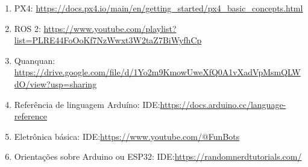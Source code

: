 \begin{enumerate}
    \item PX4: \url{https://docs.px4.io/main/en/getting_started/px4_basic_concepts.html}

    \item ROS 2: \url{https://www.youtube.com/playlist?list=PLRE44FoOoKf7NzWwxt3W2taZ7BiWyfhCp}

    \item Quanquan: \url{https://drive.google.com/file/d/1Yo2m9KmowUweXfQ0A1vXadVpMsmQLWdO/view?usp=sharing}

    \item Referência de linguagem Arduíno: IDE:\url{https://docs.arduino.cc/language-reference} 

    \item Eletrônica básica: IDE:\url{https://www.youtube.com/@FunBots} 

    \item Orientações sobre Arduino ou ESP32: IDE:\url{https://randomnerdtutorials.com/} 

\end{enumerate}

